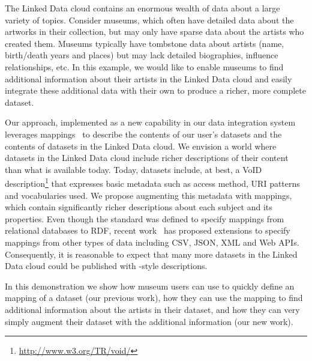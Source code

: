 The Linked Data cloud contains an enormous wealth of data about a large variety of topics.
Consider museums, which often have detailed data about the artworks in their collection, but may only have sparse data about the artists who created them.
Museums typically have tombstone data about artists (name, birth/death years and places) but may lack detailed biographies, influence relationships, etc.
In this example, we would like to enable museums to find additional information about their artists in the Linked Data cloud and easily integrate these additional data with their own to produce a richer, more complete dataset.

Our approach, implemented as a new capability in our \karma data integration system~\cite{knoblock12:eswc} leverages \rtworml mappings~\cite{Sundara:12:RRR} to describe the contents of our user's datasets and the contents of datasets in the Linked Data cloud.
We envision a world where datasets in the Linked Data cloud include richer descriptions of their content than what is available today.
Today, datasets include, at best, a VoID description\footnote{\url{http://www.w3.org/TR/void/}} that expresses basic metadata such as access method, URI patterns and vocabularies used.
We propose augmenting this metadata with \rtworml mappings, which contain significantly richer descriptions about each subject and its properties.
Even though the \rtworml standard was defined to specify mappings from relational databases to RDF, recent work~\cite{conf/semweb/DimouSCMW13} has proposed extensions to specify mappings from other types of data including CSV, JSON, XML and Web APIs.
Consequently, it is reasonable to expect that many more datasets in the Linked Data cloud could be published with \rtworml-style descriptions.

In this demonstration we show how museum users can use \karma to quickly define an \rtworml mapping of a dataset (our previous work), how they can use the \rtworml mapping to find additional information about the artists in their dataset, and how they can very simply augment their dataset with the additional information (our new work).


